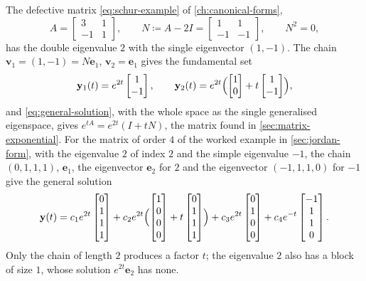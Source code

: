 The defective matrix \eqref{eq:schur-example} of \cref{ch:canonical-forms},
\[
A=\begin{bmatrix}3&1\\-1&1\end{bmatrix},\qquad N\coloneqq A-2I=\begin{bmatrix}1&1\\-1&-1\end{bmatrix},\qquad N^2=0,
\]
has the double eigenvalue $2$ with the single eigenvector $(1,-1)$. The chain $\mathbf v_1=(1,-1)=N\mathbf e_1$, $\mathbf v_2=\mathbf e_1$ gives the fundamental set
\[
\mathbf y_1(t)=e^{2t}\begin{bmatrix}1\\-1\end{bmatrix},\qquad\mathbf y_2(t)=e^{2t}\Bigl(\begin{bmatrix}1\\0\end{bmatrix}+t\begin{bmatrix}1\\-1\end{bmatrix}\Bigr),
\]
and \eqref{eq:general-solution}, with the whole space as the single generalised eigenspace, gives $e^{tA}=e^{2t}(I+tN)$, the matrix found in \cref{sec:matrix-exponential}. For the matrix of order $4$ of the worked example in \cref{sec:jordan-form}, with the eigenvalue $2$ of index $2$ and the simple eigenvalue $-1$, the chain $(0,1,1,1)$, $\mathbf e_1$, the eigenvector $\mathbf e_2$ for $2$ and the eigenvector $(-1,1,1,0)$ for $-1$ give the general solution
\[
\mathbf y(t)=c_1e^{2t}\begin{bmatrix}0\\1\\1\\1\end{bmatrix}+c_2e^{2t}\Bigl(\begin{bmatrix}1\\0\\0\\0\end{bmatrix}+t\begin{bmatrix}0\\1\\1\\1\end{bmatrix}\Bigr)+c_3e^{2t}\begin{bmatrix}0\\1\\0\\0\end{bmatrix}+c_4e^{-t}\begin{bmatrix}-1\\1\\1\\0\end{bmatrix}.
\]
Only the chain of length $2$ produces a factor $t$; the eigenvalue $2$ also has a block of size $1$, whose solution $e^{2t}\mathbf e_2$ has none.

